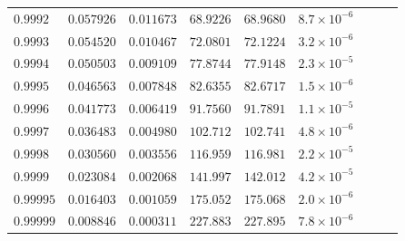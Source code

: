 \documentclass[12pt]{extarticle}
\theoremstyle{plain}
\theoremstyle{remark}
\begin{document}
\begin{longtable}{lcccccccc}
$0.9992$ & $0.057926$ & $0.011673$ & $68.9226$ & $68.9680$ & $8.7\times10^{-6}$ \\
$0.9993$ & $0.054520$ & $0.010467$ & $72.0801$ & $72.1224$ & $3.2\times10^{-6}$ \\
$0.9994$ & $0.050503$ & $0.009109$ & $77.8744$ & $77.9148$ & $2.3\times10^{-5}$ \\
$0.9995$ & $0.046563$ & $0.007848$ & $82.6355$ & $82.6717$ & $1.5\times10^{-6}$ \\
$0.9996$ & $0.041773$ & $0.006419$ & $91.7560$ & $91.7891$ & $1.1\times10^{-5}$ \\
$0.9997$ & $0.036483$ & $0.004980$ & $102.712$ & $102.741$ & $4.8\times10^{-6}$ \\
$0.9998$ & $0.030560$ & $0.003556$ & $116.959$ & $116.981$ & $2.2\times10^{-5}$ \\
$0.9999$ & $0.023084$ & $0.002068$ & $141.997$ & $142.012$ & $4.2\times10^{-5}$ \\
$0.99995$ & $0.016403$ & $0.001059$ & $175.052$ & $175.068$ & $2.0\times10^{-6}$ \\
$0.99999$ & $0.008846$ & $0.000311$ & $227.883$ & $227.895$ & $7.8\times10^{-6}$ \\
\end{longtable}
\end{document}
